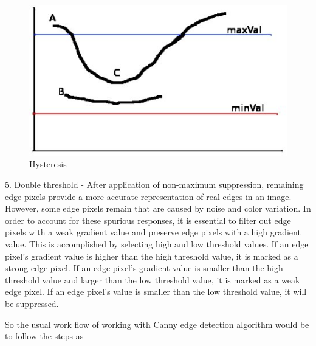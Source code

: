 \documentclass[BTech]{srmuthesis}
\begin{document}
\begin{figure}[h!]
    \centering
    \includegraphics[width=10cm\textwidth]{hysteresis}
    \caption{Hysteresis}
    \label{fig:Hysteresis}
\end{figure}

5. \underline{Double threshold} - After application of non-maximum suppression, remaining edge pixels provide a more accurate representation of real edges in an image. However, some edge pixels remain that are caused by noise and color variation. In order to account for these spurious responses, it is essential to filter out edge pixels with a weak gradient value and preserve edge pixels with a high gradient value. This is accomplished by selecting high and low threshold values. If an edge pixel's gradient value is higher than the high threshold value, it is marked as a strong edge pixel. If an edge pixel's gradient value is smaller than the high threshold value and larger than the low threshold value, it is marked as a weak edge pixel. If an edge pixel's value is smaller than the low threshold value, it will be suppressed.

So the usual work flow \cite{drexel_canny} of working with Canny edge detection algorithm would be to follow the steps as
\end{document}
